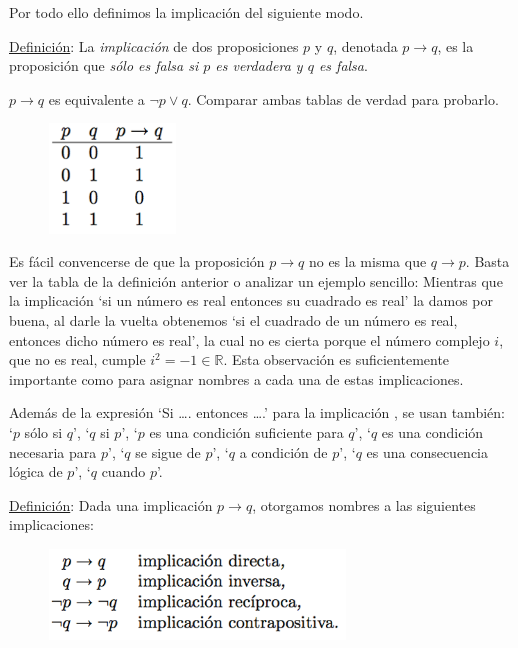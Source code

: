 Por todo ello definimos la implicación del siguiente modo.

\begin{multicols}{2}

\underline{Definición}: La \emph{implicación} de dos proposiciones $p$ y $q$, denotada $p \to  q$, es la proposición que \emph{sólo es falsa si $p$ es verdadera y $q$ es falsa}.

$p \to q$  es equivalente a  $\neg p \vee q$.  Comparar ambas tablas de verdad para probarlo.

\begin{figure}[H] 
		\centering
		\includegraphics[width=0.3\textwidth]{imagenes/apendices/APENDICESIM16.png}
	
\end{figure}

\end{multicols}


Es fácil convencerse de que la proposición $p \to  q$ no es la misma que $q \to  p$. Basta ver la tabla de la definición anterior o analizar un ejemplo sencillo: Mientras que la implicación `si un número es real entonces su cuadrado es real' la damos por buena, al darle la vuelta obtenemos `si el cuadrado de un número es real, entonces dicho número es real', la cual no es cierta porque el número complejo $i$, que no es real, cumple $i^2 = -1\in \mathbb R$. Esta observación es suficientemente importante como para asignar nombres a cada una de estas implicaciones.

Además de la expresión `Si …. entonces ….' para la implicación , se usan también: `$p$ sólo si $q$', `$q$ si $p$', `$p$ es una condición suficiente para $q$', `$q$ es una condición necesaria para $p$', `$q$ se sigue de $p$', `$q$ a condición de $p$', `$q$ es una consecuencia lógica de $p$', `$q$ cuando $p$'.

\underline{Definición}: Dada una implicación $p \to q$, otorgamos nombres a las siguientes implicaciones: 


	\begin{figure}[H] 
		\centering
		\includegraphics[width=0.7\textwidth]{imagenes/apendices/APENDICESIM17.png}
	\end{figure}

